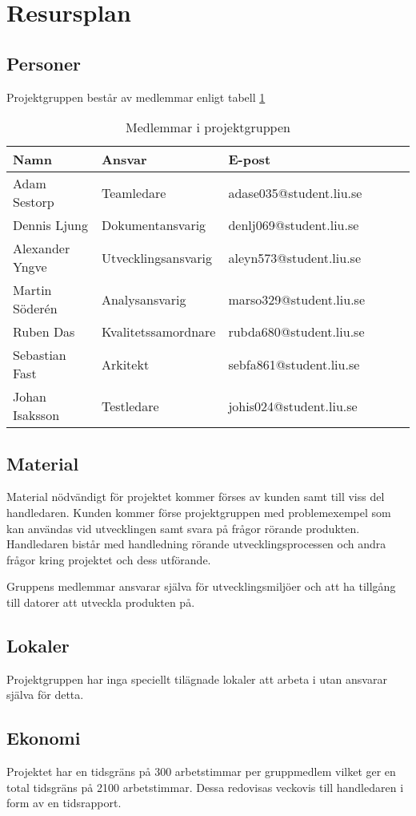 \section{Resursplan}

\subsection{Personer}
Projektgruppen består av medlemmar enligt tabell \ref{projektplan:resursplan-personer}
\begin{table}[h]
	\centering
		\begin{tabularx}{\textwidth}{| l | l | X | l | l | l |}
			\hline
			\textbf{Namn} & \textbf{Ansvar} & \textbf{E-post} \\
			\hline
			{Adam Sestorp} & {Teamledare} & {adase035@student.liu.se} \\\hline
			{Dennis Ljung} & {Dokumentansvarig} & {denlj069@student.liu.se} \\\hline
			{Alexander Yngve} & {Utvecklingsansvarig} & {aleyn573@student.liu.se} \\\hline
			{Martin Söderén} & {Analysansvarig} & {marso329@student.liu.se} \\\hline
			{Ruben Das} & {Kvalitetssamordnare} & {rubda680@student.liu.se} \\\hline
			{Sebastian Fast} & {Arkitekt} & {sebfa861@student.liu.se} \\\hline
			{Johan Isaksson} & {Testledare} & {johis024@student.liu.se} \\\hline

		\end{tabularx}
	\caption{Medlemmar i projektgruppen} \label{projektplan:resursplan-personer}
\end{table}

\subsection{Material}
Material nödvändigt för projektet kommer förses av kunden samt till viss del handledaren. Kunden kommer förse projektgruppen med problemexempel som kan användas vid utvecklingen samt svara på frågor rörande produkten. Handledaren bistår med handledning rörande utvecklingsprocessen och andra frågor kring projektet och dess utförande.

Gruppens medlemmar ansvarar själva för utvecklingsmiljöer och att ha tillgång till datorer att utveckla produkten på.

\subsection{Lokaler}
Projektgruppen har inga speciellt tilägnade lokaler att arbeta i utan ansvarar själva för detta.

\subsection{Ekonomi}
Projektet har en tidsgräns på 300 arbetstimmar per gruppmedlem vilket ger en total tidsgräns på 2100 arbetstimmar. Dessa redovisas veckovis till handledaren i form av en tidsrapport.
